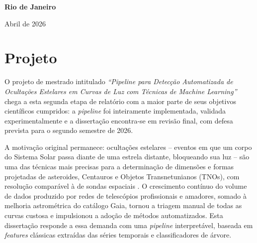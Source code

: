 \documentclass[12pt]{article}
\numberwithin{equation}{section}
\begin{document}
\baselineskip 17pt

\vspace*{1.5cm}
\begin{center}
{{\bf Rio de Janeiro\par{Abril de 2026}}}
\end{center}

\vspace*{.05cm}

\renewcommand{\thefootnote}{\arabic{footnote}}

\setcounter{footnote}{1}

\pagebreak

\baselineskip 19pt


\pagestyle{fancy}
\tableofcontents
{}


\newpage

\section{\sc Projeto}

O projeto de mestrado intitulado \textit{``Pipeline para Detecção Automatizada de Ocultações Estelares em Curvas de Luz com Técnicas de Machine Learning''} chega a esta segunda etapa de relatório com a maior parte de seus objetivos científicos cumpridos: a \textit{pipeline} foi inteiramente implementada, validada experimentalmente e a dissertação encontra-se em revisão final, com defesa prevista para o segundo semestre de 2026.

A motivação original permanece: ocultações estelares -- eventos em que um corpo do Sistema Solar passa diante de uma estrela distante, bloqueando sua luz -- são uma das técnicas mais precisas para a determinação de dimensões e formas projetadas de asteroides, Centauros e Objetos Transnetunianos (TNOs), com resolução comparável à de sondas espaciais \citep{Sicardy2011, Knieling2024}. O crescimento contínuo do volume de dados produzido por redes de telescópios profissionais e amadores, somado à melhoria astrométrica do catálogo Gaia, tornou a triagem manual de todas as curvas custosa e impulsionou a adoção de métodos automatizados. Esta dissertação responde a essa demanda com uma \textit{pipeline} interpretável, baseada em \textit{features} clássicas extraídas das séries temporais e classificadores de árvore.
\end{document}
